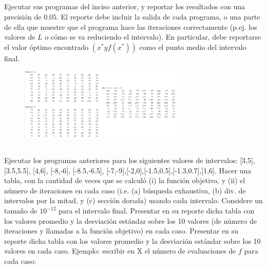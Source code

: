 \documentclass[12pt,oneside]{book}
\begin{document}
\subsection[Ejercicio 2]{}
Ejecutar sus programas del inciso anterior, y reportar los resultados con una
precisión de $0.05$. El reporte debe incluir la salida de cada programa, o una
parte de ella que muestre que el programa hace las iteraciones correctamente (p.ej. los valores de $L$ o cómo se va reduciendo el intervalo). En particular, debe
reportarse el valor óptimo encontrado $(x^* y f(x^*))$ como el punto medio del
intervalo final.

\begin{figure}[H]
    \centering
    \includegraphics[width = 0.7\textwidth]{figura2}
\end{figure}


\subsection[Ejercicio 3]{}
Ejecutar los programas anteriores para los siguientes valores de intervalos: [3,5], [3.5,5.5], [4,6], [-8,-6], [-8.5,-6.5], [-7,-9],[-2,0],[-1.5,0.5],[-1.3,0.7],[1,6]. Hacer una tabla, con la cantidad de veces que se calculó (i) la
función objetivo, y (ii) el número de iteraciones en cada caso (i.e. (a)
búsqueda exhaustiva, (b) div. de intervalos por la mitad, y (c) sección
dorada) usando cada intervalo. Considere un tamaño de $10^{-12}$ para el intervalo
final. Presentar en su reporte dicha tabla con los valores promedio y la
desviación estándar sobre los 10 valores (de número de iteraciones y llamadas
a la función objetivo) en cada caso. Presentar en su reporte dicha tabla con
los valores promedio y la desviación estándar sobre los 10 valores en cada caso. Ejemplo: escribir en X el número de evaluaciones de $f$ para
cada caso:
\end{document}

